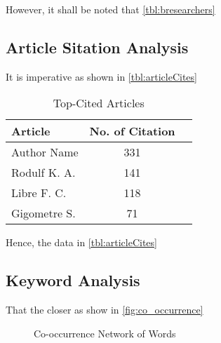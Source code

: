 \documentclass[journal, a4paper]{IEEEtran}
\begin{document}
However, it shall be noted that \autoref{tbl:bresearchers} \lipsum[1]\lipsum[1]


\subsection{Article Sitation Analysis}
It is imperative as shown in \autoref{tbl:articleCites} \lipsum[1]

\begin{table}[htbp]

  \centering
  \caption{Top-Cited Articles}
  \label{tbl:articleCites}
  \begin{tabular}{lcc}

      \toprule
      \textbf{Article} & \textbf{No. of Citation} \\
      \midrule
      Author Name       \cite{Hu2023}           &    331         \\
      Rodulf K. A.      \cite{Lingxin2022}      &    141         \\
      Libre F. C.       \cite{Entezami2020}     &    118         \\
      Gigometre S.      \cite{Lee2023}          &    71          \\
      \bottomrule
  \end{tabular}
\end{table}

Hence, the data in \autoref{tbl:articleCites} \lipsum[1]



\subsection{Keyword Analysis}
That the closer as show in \autoref{fig:co_occurrence} \lipsum[1]

\begin{figure}[htbp]
  \centering
  \caption{Co-occurrence Network of Words}
  \label{fig:co_occurrence}
\end{figure}
\end{document}
